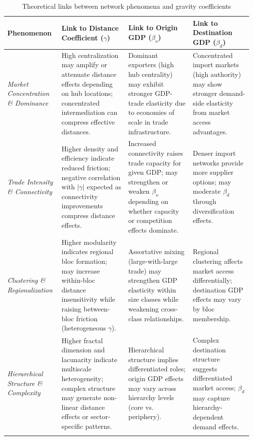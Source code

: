 \documentclass[preprint, 3p,
authoryear]{elsarticle} %
\begin{document}
\begin{table}[H]
\centering
\caption{Theoretical links between network phenomena and gravity coefficients}
\label{tab:indicator_gravity_link}
\scriptsize
\begin{tabular}{@{}p{2.8cm}p{4.2cm}p{4.2cm}p{3.8cm}@{}}
\toprule
\textbf{Phenomenon} & \textbf{Link to Distance Coefficient ($\gamma$)} & \textbf{Link to Origin GDP ($\beta_o$)} & \textbf{Link to Destination GDP ($\beta_d$)} \\
\midrule

\textit{Market Concentration \& Dominance} & 
High centralization may amplify or attenuate distance effects depending on hub locations; concentrated intermediation can compress effective distances. & 
Dominant exporters (high hub centrality) may exhibit stronger GDP-trade elasticity due to economies of scale in trade infrastructure. & 
Concentrated import markets (high authority) may show stronger demand-side elasticity from market access advantages. \\
\addlinespace

\textit{Trade Intensity \& Connectivity} & 
Higher density and efficiency indicate reduced friction; negative correlation with $|\gamma|$ expected as connectivity improvements compress distance effects. & 
Increased connectivity raises trade capacity for given GDP; may strengthen or weaken $\beta_o$ depending on whether capacity or competition effects dominate. & 
Denser import networks provide more supplier options; may moderate $\beta_d$ through diversification effects. \\
\addlinespace

\textit{Clustering \& Regionalization} & 
Higher modularity indicates regional bloc formation; may increase within-bloc distance insensitivity while raising between-bloc friction (heterogeneous $\gamma$). & 
Assortative mixing (large-with-large trade) may strengthen GDP elasticity within size classes while weakening cross-class relationships. & 
Regional clustering affects market access differentially; destination GDP effects may vary by bloc membership. \\
\addlinespace

\textit{Hierarchical Structure \& Complexity} & 
Higher fractal dimension and lacunarity indicate multiscale heterogeneity; complex structure may generate non-linear distance effects or sector-specific patterns. & 
Hierarchical structure implies differentiated roles; origin GDP effects may vary across hierarchy levels (core vs. periphery). & 
Complex destination structure suggests differentiated market access; $\beta_d$ may capture hierarchy-dependent demand effects. \\
\addlinespace


\end{tabular}
\end{table}
\end{document}

